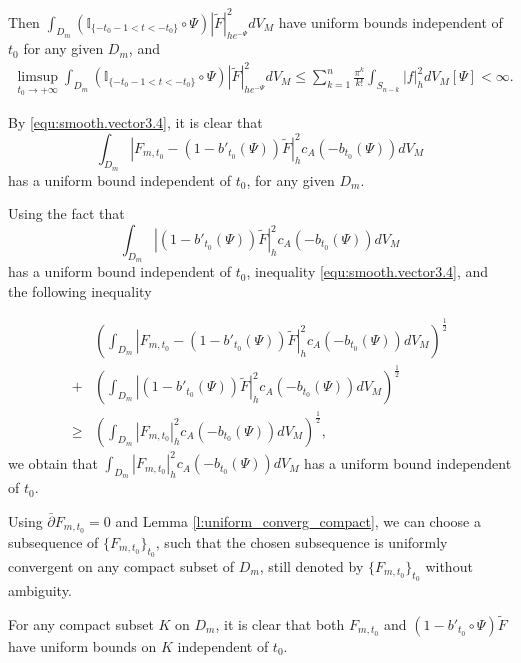 Then $\int_{D_m}(\mathbb{I}_{\{-t_{0}-1<
t<-t_{0}\}}\circ\Psi)|\tilde{F}|^{2}_{he^{-\Psi}}dV_{M}$ have
uniform bounds independent of $t_{0}$ for any given $D_m$, and
\begin{equation}
\label{equ:smooth.vector3.7}
\begin{split}
\limsup_{t_{0}\to+\infty}\int_{D_m}
(\mathbb{I}_{\{-t_{0}-1< t<-t_{0}\}}\circ\Psi)|\tilde{F}|^{2}_{he^{-\Psi}}dV_{M}
\leq\sum_{k=1}^{n}\frac{\pi^{k}}{k!}\int_{S_{n-k}}|f|^{2}_{h}dV_{M}[\Psi]<\infty.
\end{split}
\end{equation}

By \eqref{equ:smooth.vector3.4}, it is clear that
$$\int_{ D_m}|F_{m,t_0}-(1-b'_{t_0}(\Psi))\tilde{F}|^{2}_{h}c_{A}(-b_{t_0}(\Psi))dV_{M}$$
has a uniform bound independent of $t_{0}$, for any given $D_m$.

Using the fact that
$$\int_{ D_m}|(1-b'_{t_0}(\Psi))\tilde{F}|^{2}_{h}c_{A}(-b_{t_0}(\Psi))dV_{M}$$
has a uniform bound independent of $t_{0}$, inequality
\ref{equ:smooth.vector3.4}, and the following inequality

\begin{equation}
\label{equ:smooth.vector3.9}
\begin{split}
&(\int_{ D_m}|F_{m,t_0}-(1-b'_{t_0}(\Psi))\tilde{F}|^{2}_{h}c_{A}(-b_{t_0}(\Psi))dV_{M})^{\frac{1}{2}}
\\+&(\int_{ D_m}|(1-b'_{t_0}(\Psi))\tilde{F}|^{2}_{h}c_{A}(-b_{t_0}(\Psi))dV_{M})^{\frac{1}{2}}
\\\geq&
(\int_{ D_m}|F_{m,t_0}|^{2}_{h}c_{A}(-b_{t_0}(\Psi))dV_{M})^{\frac{1}{2}},
\end{split}
\end{equation}
we obtain that $\int_{
D_m}|F_{m,t_0}|^{2}_{h}c_{A}(-b_{t_0}(\Psi))dV_{M}$ has a uniform
bound independent of $t_{0}$.

Using $\bar\partial F_{m,t_{0}}=0$ and Lemma
\ref{l:uniform_converg_compact}, we can choose a subsequence of
$\{F_{m,t_{0}}\}_{t_{0}}$, such that the chosen subsequence is
uniformly convergent on any compact subset of $D_m$, still denoted
by $\{F_{m,t_0}\}_{t_{0}}$ without ambiguity.

For any compact subset $K$ on $D_m$, it is clear that both
$F_{m,t_0}$ and $(1-b'_{t_0}\circ\Psi)\tilde{F}$ have uniform bounds
on $K$ independent of $t_0$.

